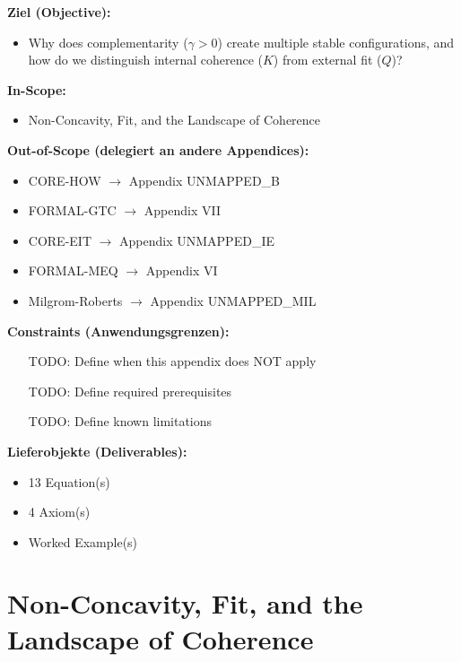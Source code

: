 \begin{tcolorbox}[
    colback=orange!5!white,
    colframe=orange!75!black,
    title={\textbf{Appendix Scope: Ziel / In-Scope / Out-of-Scope / Constraints}},
    fonttitle=\bfseries
]

\textbf{Ziel (Objective):}
\begin{itemize}[nosep]
    \item Why does complementarity ($\gamma > 0$) create multiple stable configurations, and how do we distinguish internal coherence ($K$) from external fit ($Q$)?
\end{itemize}

\textbf{In-Scope:}
\begin{itemize}[nosep]
    \item Non-Concavity, Fit, and the Landscape of Coherence
\end{itemize}

\textbf{Out-of-Scope (delegiert an andere Appendices):}
\begin{itemize}[nosep]
    \item CORE-HOW $\rightarrow$ Appendix UNMAPPED_B
    \item FORMAL-GTC $\rightarrow$ Appendix VII
    \item CORE-EIT $\rightarrow$ Appendix UNMAPPED_IE
    \item FORMAL-MEQ $\rightarrow$ Appendix VI
    \item Milgrom-Roberts $\rightarrow$ Appendix UNMAPPED_MIL
\end{itemize}

\textbf{Constraints (Anwendungsgrenzen):}
\begin{itemize}[nosep]
    \item [TODO: Define when this appendix does NOT apply]
    \item [TODO: Define required prerequisites]
    \item [TODO: Define known limitations]
\end{itemize}

\textbf{Lieferobjekte (Deliverables):}
\begin{itemize}[nosep]
    \item 13 Equation(s)
    \item 4 Axiom(s)
    \item Worked Example(s)
\end{itemize}

\end{tcolorbox}


\section{Non-Concavity, Fit, and the Landscape of Coherence}
\label{app:formal-nc}

